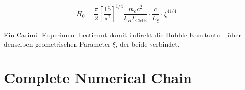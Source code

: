 \begin{equation}
    H_0 = \frac{\pi}{2}\left[\frac{15}{\pi^2}\right]^{1/4}
          \frac{m_e c^2}{k_B T_\text{CMB}}
          \cdot \frac{c}{L_\xi} \cdot \xi^{41/4}
    \label{eq:H0_from_Casimir}
\end{equation}

Ein Casimir-Experiment bestimmt damit indirekt die Hubble-Konstante --
über denselben geometrischen Parameter $\xi$, der beide verbindet.

\section{Complete Numerical Chain}
\label{sec:numerical}

\begin{table}[H]
    \centering
    \caption{Numerical verification of the complete chain}
    \label{tab:numerical}
\end{table}

